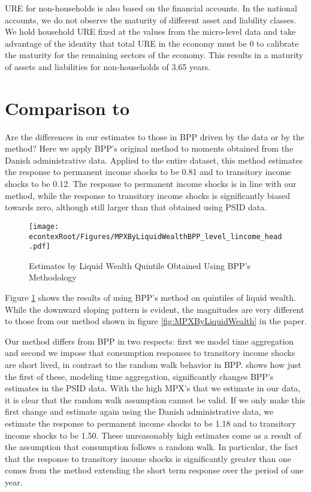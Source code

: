 \documentclass[titlepage]{\econtex}\newcommand{\texname}{ConsumptionHeterogeneity}
\begin{document}
URE for non-households is also based on the financial accounts. In the national accounts, we do not observe the maturity of different asset and liability classes. We hold household URE fixed at the values from the micro-level data and take advantage of the identity that total URE in the economy must be 0 to calibrate the maturity for the remaining sectors of the economy. This results in a maturity of assets and liabilities for non-households of 3.65 years.

\section{Comparison to \cite{blundell_consumption_2008}} \label{BPP_compare}
Are the differences in our estimates to those in BPP driven by the data or by the method? Here we apply BPP's original method to moments obtained from the Danish administrative data. Applied to the entire dataset, this method estimates the response to permanent income shocks to be 0.81 and to transitory income shocks to be 0.12. The response to permanent income shocks is in line with our method, while the response to transitory income shocks is significantly biased towards zero, although still larger than that obtained using PSID data.

\begin{figure} 
	\begin{centering}
		\texttt{[image: \\econtexRoot/Figures/MPXByLiquidWealthBPP\_level\_lincome\_head.pdf]}
		\caption{Estimates by Liquid Wealth Quintile Obtained Using BPP's Methodology}
		\label{fig:BPP_liquid}
	\end{centering}
\end{figure}

Figure \ref{fig:BPP_liquid} shows the results of using BPP's method on quintiles of liquid wealth. While the downward sloping pattern is evident, the magnitudes are very different to those from our method shown in figure \ref{fig:MPXByLiquidWealth} in the paper.  

Our method differs from BPP in two respects: first we model time aggregation and second we impose that consumption responses to transitory income shocks are short lived, in contrast to the random walk behavior in BPP. \cite{crawley_time_2019} shows how just the first of these, modeling time aggregation, significantly changes BPP's estimates in the PSID data. With the high MPX's that we estimate in our data, it is clear that the random walk assumption cannot be valid. If we only make this first change and estimate again using the Danish administrative data, we estimate the response to permanent income shocks to be 1.18 and to transitory income shocks to be 1.50. These unreasonably high estimates come as a result of the assumption that consumption follows a random walk. In particular, the fact that the response to transitory income shocks is significantly greater than one comes from the method extending the short term response over the period of one year.
\end{document}
